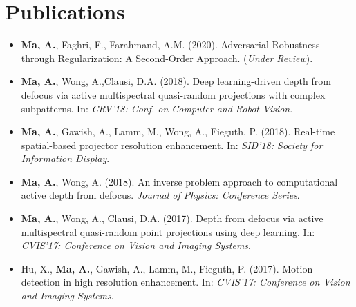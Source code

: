 \section*{Publications}
    \vspace{\postsubhead}
    \begin{adjustwidth}{\indentleft}{\indentright}
        \begin{itemize}
            \setlength\itemsep{0.5em}
            
            \item \textbf{Ma, A.}, Faghri, F., Farahmand, A.M. (2020). Adversarial Robustness through Regularization: A Second-Order Approach. (\textit{Under Review}).
            
            \item \textbf{Ma, A.}, Wong, A.,Clausi, D.A. (2018). Deep learning-driven depth from defocus via active multispectral quasi-random projections with complex subpatterns. In: \emph{CRV'18: Conf. on Computer and Robot Vision}.
            
            \item \textbf{Ma, A.}, Gawish, A., Lamm, M., Wong, A., Fieguth, P. (2018). Real-time spatial-based projector resolution enhancement. In: \emph{SID'18: Society for Information Display}.
            
            \item \textbf{Ma, A.}, Wong, A. (2018). An inverse problem approach to computational active depth from defocus. \emph{Journal of Physics: Conference Series}.
            
            \item \textbf{Ma, A.}, Wong, A., Clausi, D.A. (2017). Depth from defocus via active multispectral quasi-random point projections using deep learning. In: \emph{CVIS'17: Conference on Vision and Imaging Systems}.
           
            \item Hu, X., \textbf{Ma, A.}, Gawish, A., Lamm, M., Fieguth, P. (2017). Motion detection in high resolution enhancement. In: \emph{CVIS'17: Conference on Vision and Imaging Systems}.
            

\end{itemize}
\end{adjustwidth}
